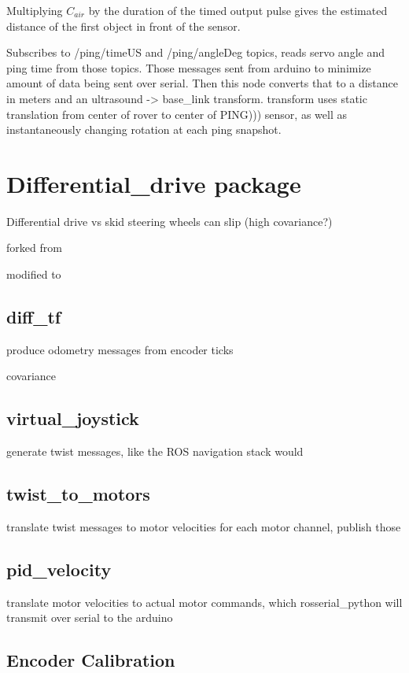Multiplying \(C_{air}\) by the duration of the timed output pulse gives the estimated distance of the first object in front of the sensor.

Subscribes to /ping/timeUS and /ping/angleDeg topics, reads servo angle and ping time from those topics. Those messages sent from arduino to minimize amount of data being sent over serial. Then this node converts that to a distance in meters and an ultrasound -> base\_link transform. transform uses static translation from center of rover to center of PING))) sensor, as well as instantaneously changing rotation at each ping snapshot.

\section{Differential\_drive package}

Differential drive vs skid steering
wheels can slip
(high covariance?)

forked from %

modified to 

\subsection{diff\_tf}
produce odometry messages from encoder ticks

covariance

\subsection{virtual\_joystick}
generate twist messages, like the ROS navigation stack would

\subsection{twist\_to\_motors}
translate twist messages to motor velocities for each motor channel, publish those


\subsection{pid\_velocity}
translate motor velocities to actual motor commands, which rosserial\_python will transmit over serial to the arduino

\subsection{Encoder Calibration}

